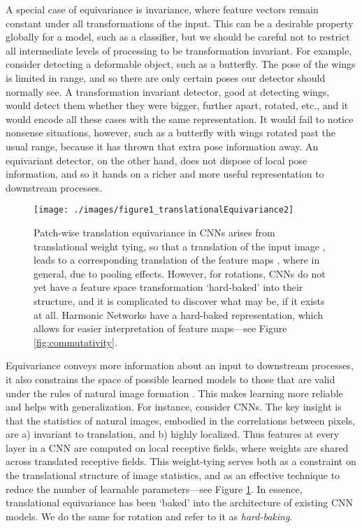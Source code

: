\documentclass[10pt,twocolumn,letterpaper]{article}
\begin{document}
A special case of equivariance is invariance, where feature vectors remain constant under all transformations of the input. This can be a desirable property globally for a model, such as a classifier, but we should be careful not to restrict all intermediate levels of processing to be transformation invariant. For example, consider detecting a deformable object, such as a butterfly. The pose of the wings is limited in range, and so there are only certain poses our detector should normally see. A transformation invariant detector, good at detecting wings, would detect them whether they were bigger, further apart, rotated, etc., and it would encode all these cases with the same representation. It would fail to notice nonsense situations, however, such as a butterfly with wings rotated past the usual range, because it has thrown that extra pose information away. An equivariant detector, on the other hand, does not dispose of local pose information, and so it hands on a richer and more useful representation to downstream processes.
\begin{figure}[t]
	\texttt{[image: ./images/figure1\_translationalEquivariance2]}
    \caption{Patch-wise translation equivariance in CNNs arises from 
    translational weight tying, so that a translation  of the input image 
    , leads to a corresponding translation  of the feature 
    maps , where  in general, due to pooling 
    effects. However, for rotations, CNNs do not yet have a feature space transformation
     `hard-baked' into their structure, and it is complicated to discover 
    what  may be, if it exists at all. Harmonic Networks have
    a hard-baked representation, which allows for easier interpretation of
    feature maps---see Figure \ref{fig:commutativity}.}
    \label{fig:Z_equivariance}
\vspace{-1em}
\end{figure}
Equivariance conveys more information about an input to downstream processes, it also constrains the space of possible learned models to those that are valid under the rules of natural image formation \cite{soatto2009actionable}. This makes learning more reliable and helps with generalization. For instance, consider CNNs. The key insight is that the statistics of 
natural images, embodied in the correlations between pixels, are 
a) invariant to translation, and b) highly localized. Thus 
features at every layer in a CNN are computed on local receptive 
fields, where weights are shared across translated receptive fields. 
This weight-tying serves both as a constraint on the translational 
structure of image statistics, and as an effective technique to reduce 
the number of learnable parameters---see Figure \ref{fig:Z_equivariance}.
In essence, translational equivariance has been `baked' into the
architecture of existing CNN models. We do the same for rotation and 
refer to it as \emph{hard-baking}.
\end{document}
